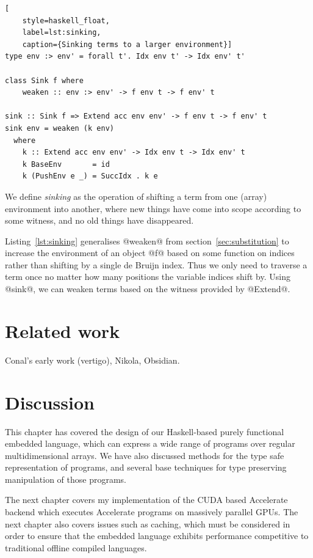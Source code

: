\begin{lstlisting}[
    style=haskell_float,
    label=lst:sinking,
    caption={Sinking terms to a larger environment}]
type env :> env' = forall t'. Idx env t' -> Idx env' t'

class Sink f where
    weaken :: env :> env' -> f env t -> f env' t

sink :: Sink f => Extend acc env env' -> f env t -> f env' t
sink env = weaken (k env)
  where
    k :: Extend acc env env' -> Idx env t -> Idx env' t
    k BaseEnv       = id
    k (PushEnv e _) = SuccIdx . k e
\end{lstlisting}

We define \emph{sinking} as the operation of shifting a term from one (array)
environment into another, where new things have come into scope according to
some witness, and no old things have disappeared.

Listing~\ref{lst:sinking} generalises @weaken@ from
section~\ref{sec:substitution} to increase the environment of an object @f@
based on some function on indices rather than shifting by a single de Bruijn
index. Thus we only need to traverse a term once no matter how many positions
the variable indices shift by. Using @sink@, we can weaken terms based on the
witness provided by @Extend@.



\section{Related work}

Conal's early work (vertigo), Nikola, Obsidian.


\section{Discussion}

This chapter has covered the design of our Haskell-based purely functional
embedded language, which can express a wide range of programs over regular
multidimensional arrays. We have also discussed methods for the type safe
representation of programs, and several base techniques for type preserving
manipulation of those programs.

The next chapter covers my implementation of the CUDA based Accelerate backend
which executes Accelerate programs on massively parallel GPUs. The next chapter
also covers issues such as caching, which must be considered in order to ensure
that the embedded language exhibits performance competitive to traditional
offline compiled languages.

